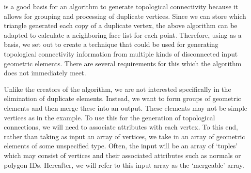 \documentclass[10pt,journal,cspaper,compsoc]{IEEEtran}
\begin{document}

 is a good basis for an algorithm to generate topological connectivity because it allows for
grouping and processing of duplicate vertices. Since we can store which triangle generated each copy of a duplicate vertex,
 the above algorithm can be adapted to calculate a neighboring face list for each point. Therefore, using  as a basis, we set out to create a technique that could be used for generating topological connectivity information 
from multiple kinds of disconnected input geometric elements. There are several requirements for this which the  algorithm
does not immediately meet.

Unlike the creators of the  algorithm, we are not interested specifically in the elimination of duplicate elements. Instead, we want
to form groups of geometric elements and then merge these into an output. These elements may not be simple vertices as in the  example.
To use this for the generation of topological connections, we will need to associate attributes with each vertex. To this end, rather than taking as input an array of vertices,
we take in an array of geometric elements of some unspecified type. Often, the input will be an array of `tuples' which may consist of
vertices and their associated attributes such as normals or polygon IDs. Hereafter, we will refer to this input array as the `mergeable' array.
\end{document}
